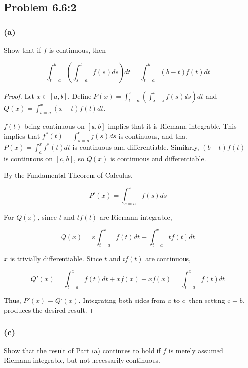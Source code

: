 \documentclass{amsart}
\begin{document}
\subsection*{Problem 6.6:2}

\subsubsection*{(a)}

Show that if $f$ is continuous, then

\[
\int_{t=a}^b \left(\int_{s=a}^t f(s) ds \right) dt
= \int_{t=a}^b (b-t) f(t) dt
\]

\begin{proof}

Let $x \in [a, b]$. Define $P(x) = \int_{t=a}^x \left(\int_{s=a}^t f(s) ds \right) dt$ and $Q(x) = \int_{t=a}^x (x-t) f(t) dt$.

$f(t)$ being continuous on $[a, b]$ implies that it is Riemann-integrable. This implies that $f^*(t) = \int_{s=a}^t f(s) ds$ is continuous, and that $P(x) = \int_a^x f^*(t)dt$ is continuous and differentiable. Similarly, $(b-t)f(t)$ is continuous on $[a, b]$, so $Q(x)$ is continuous and differentiable.

By the Fundamental Theorem of Calculus,

\[
P'(x) = \int_{s=a}^x f(s) ds
\]

For $Q(x)$, since $t$ and $tf(t)$ are Riemann-integrable,

\[
Q(x) = x \int_{t=a}^x f(t) dt - \int_{t=a}^x t f(t) dt
\]

$x$ is trivially differentiable. Since $t$ and $tf(t)$ are continuous,

\[
Q'(x) = \int_{t=a}^x f(t) dt + x f(x) - x f(x) = \int_{t=a}^x f(t) dt
\]

Thus, $P'(x) = Q'(x)$. Integrating both sides from $a$ to $c$, then setting $c = b$, produces the desired result.

\end{proof}

\subsubsection*{(c)}

Show that the result of Part (a) continues to hold if $f$ is merely assumed Riemann-integrable, but not necessarily continuous.
\end{document}
